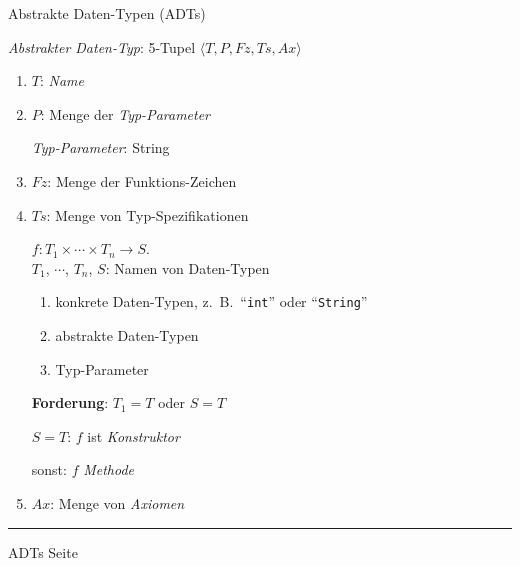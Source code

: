\documentclass{slides}
\newcounter{mypage}
\begin{document}

\begin{slide}{}
\begin{center}
Abstrakte Daten-Typen (ADTs)
\end{center}

\footnotesize
\emph{Abstrakter Daten-Typ}: 5-Tupel $\langle T, P, Fz, Ts, Ax \rangle$
\begin{enumerate}
\item $T$: \textsl{Name}
\item $P$: Menge der \textsl{Typ-Parameter}

      \textsl{Typ-Parameter}: String
\item $Fz$: Menge der Funktions-Zeichen
\item $Ts$: Menge von Typ-Spezifikationen 

      $f: T_1 \times \cdots \times T_n \rightarrow S$. \\[0.1cm]
      
      $T_1$, $\cdots$, $T_n$, $S$: Namen von Daten-Typen
      \begin{enumerate}
      \item konkrete Daten-Typen, z.~B.~``\texttt{int}'' oder ``\texttt{String}''
      \item abstrakte Daten-Typen
      \item Typ-Parameter
      \end{enumerate}

      \textbf{Forderung}: $T_1 = T$ oder $S = T$

      $S = T$: $f$ ist \textsl{Konstruktor} 

      sonst: $f$ \textsl{Methode}
\item $Ax$: Menge von \textsl{Axiomen} 
\end{enumerate}


\vspace*{\fill}
\tiny \addtocounter{mypage}{1}
\rule{17cm}{1mm}
ADTs  \hspace*{\fill} Seite 
\end{slide}

\end{document}
